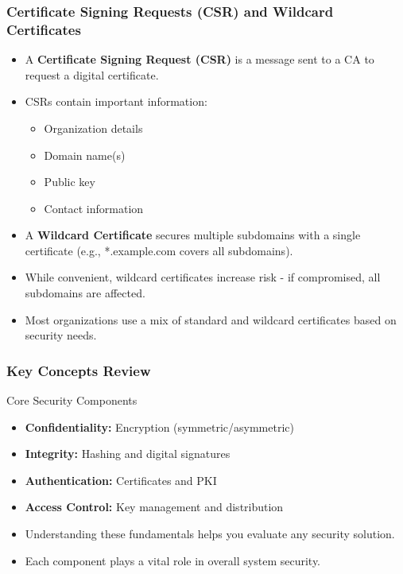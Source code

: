 \documentclass{beamer}
\begin{document}
\begin{frame}
    \frametitle{Certificate Signing Requests (CSR) and Wildcard Certificates}
    
    \begin{itemize}
        \item A \textbf{Certificate Signing Request (CSR)} is a message sent to a CA to request a digital certificate.
        
        \item CSRs contain important information:
            \begin{itemize}
                \item Organization details
                \item Domain name(s)
                \item Public key
                \item Contact information
            \end{itemize}
        
        \item A \textbf{Wildcard Certificate} secures multiple subdomains with a single certificate (e.g., *.example.com covers all subdomains).
        
        \item While convenient, wildcard certificates increase risk - if compromised, all subdomains are affected.
        
        \item Most organizations use a mix of standard and wildcard certificates based on security needs.
    \end{itemize}
\end{frame}

\begin{frame}
    \frametitle{Key Concepts Review}
    
    \begin{block}{Core Security Components}
        \begin{itemize}
            \item \textbf{Confidentiality:} Encryption (symmetric/asymmetric)
            \item \textbf{Integrity:} Hashing and digital signatures
            \item \textbf{Authentication:} Certificates and PKI
            \item \textbf{Access Control:} Key management and distribution
        \end{itemize}
    \end{block}
    
    \begin{itemize}
        \item Understanding these fundamentals helps you evaluate any security solution.
        \item Each component plays a vital role in overall system security.
    \end{itemize}
\end{frame}
\end{document}
